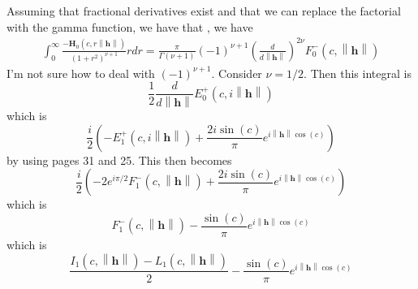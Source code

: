 \documentclass[11pt]{article}
\begin{document}

Assuming that fractional derivatives exist and that we can replace the factorial with the gamma function, we have that , we have \begin{align*}
\int_0^\infty \frac{-\boldsymbol{H}_{0}(c, r \left\lVert \boldsymbol{h}\right\rVert)}{(1 + r^2)^{\nu+1}}r dr=
\frac{\pi}{\Gamma(\nu + 1)} (-1)^{\nu + 1} \left(\frac{d}{d\left\lVert \boldsymbol{h}\right\rVert}\right)^{2\nu} F_0^-(c, \left\lVert \boldsymbol{h}\right\rVert)
\end{align*}I'm not sure how to deal with $(-1)^{\nu + 1}$. Consider $\nu= 1/2$. Then this integral is $$\frac{1}{2} \frac{d}{d \left\lVert \boldsymbol{h}\right\rVert} E_0^+(c,i\left\lVert \boldsymbol{h}\right\rVert)$$which is $$\frac{i}{2} \left(- E_1^+(c,i\left\lVert \boldsymbol{h}\right\rVert) + \frac{2 i \sin(c)}{\pi } e^{i\left\lVert \boldsymbol{h}\right\rVert \cos(c)}\right)$$by using pages 31 and 25. This then becomes $$\frac{i}{2} \left(- 2 e^{i \pi/2}F_1^-(c,\left\lVert \boldsymbol{h}\right\rVert) + \frac{2 i \sin(c)}{\pi } e^{i\left\lVert \boldsymbol{h}\right\rVert \cos(c)}\right)$$ which is $$F_1^-(c,\left\lVert \boldsymbol{h}\right\rVert) - \frac{ \sin(c)}{\pi } e^{i\left\lVert \boldsymbol{h}\right\rVert \cos(c)}$$ which is $$\frac{I_1(c,\left\lVert \boldsymbol{h}\right\rVert) - L_1(c, \left\lVert \boldsymbol{h}\right\rVert)}{2}  - \frac{ \sin(c)}{\pi } e^{i\left\lVert \boldsymbol{h}\right\rVert \cos(c)}$$ 
%
\end{document}
